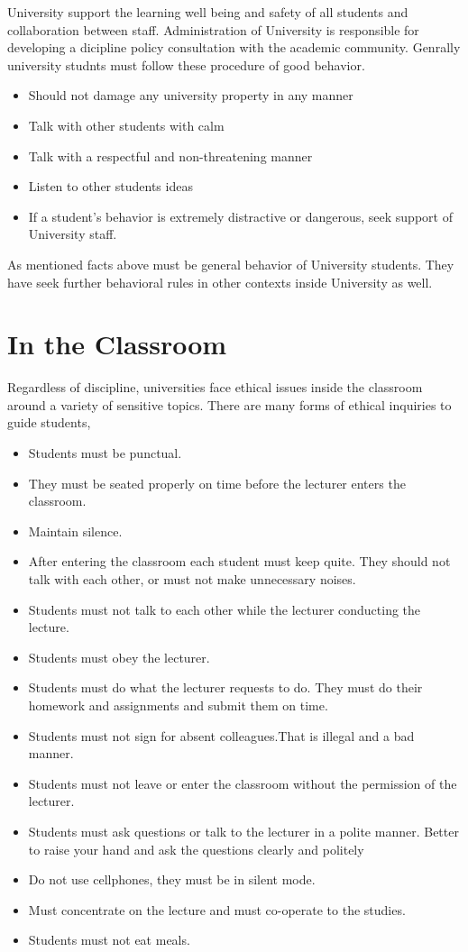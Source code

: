 \documentclass[12pt,a4paper]{article}
\begin{document}
University support the learning well being and safety of all students and collaboration between staff.  Administration of University is responsible for developing a dicipline policy consultation with the academic community. 
Genrally university studnts must follow these procedure of good behavior. 
\begin{itemize}
	\item Should not damage any university property in any manner
	\item Talk with other students with calm
	\item Talk with a respectful and non-threatening manner
	\item Listen to other students ideas
	\item If a student’s behavior is extremely distractive or dangerous, seek support of University staff. 
\end{itemize}
As mentioned facts above must be general behavior of University students. They have seek further behavioral rules in other contexts inside University as well.  

\newpage
\section{In the Classroom}
Regardless of discipline, universities face ethical issues inside the classroom around a variety of sensitive topics. There are many forms of ethical inquiries to guide students,
\begin{itemize}
	\item Students must be punctual.
	\item They must be seated properly on time before the lecturer enters the classroom.
	\item Maintain silence.
	\item After entering the classroom each student must keep quite. They should not talk with each other, or must not make unnecessary noises.
	\item Students must not talk to each other while the lecturer conducting the lecture.
	\item Students must obey the lecturer.
	\item Students must do what the lecturer requests to do. They must do their homework and assignments and submit them on time.
	\item Students must not sign for absent colleagues.That is illegal and a bad manner.
	\item Students must not leave or enter the classroom without the permission of the lecturer.
	\item Students must ask questions or talk to the lecturer in a polite manner.                         Better to raise your hand and ask the questions clearly and politely
	\item Do not use cellphones, they must be in silent mode.
	\item Must concentrate on the lecture and must co-operate to the studies.
	\item Students must not eat meals.
\end{itemize}
\end{document}
